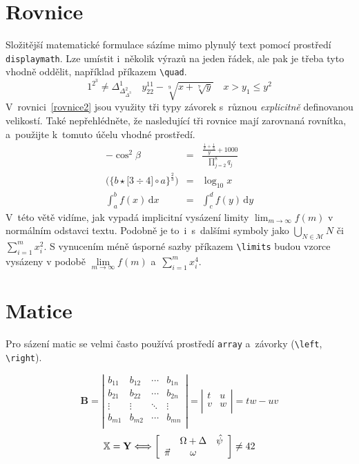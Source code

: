 \documentclass[hidelinks ,twoside, 11pt ,twocolumn, a4paper]{article}
\begin{document}
\section{Rovnice}
Složitější matematické formulace sázíme mimo plynulý text pomocí prostředí \verb|displaymath|. Lze umístit i~několik výrazů na jeden řádek, ale pak je třeba tyto vhodně oddělit, například příkazem \verb|\quad|. 
\begin{displaymath}
1^{2^3} \neq \Delta^1_{\Delta^2_{\Delta^3}}\quad
y^{11}_{22} - \sqrt[9]{x+\sqrt[7]{y}}\quad
 x > y_1 \le y^2
\end{displaymath}
V~rovnici~\eqref{rovnice2} jsou využity tři typy závorek s~různou \textit{explicitně} definovanou velikostí. Také nepřehlédněte, že nasledující tři rovnice mají zarovnaná rovnítka, a~použijte k~tomuto účelu vhodné prostředí.
\begin{eqnarray}
-\cos^2\beta & = & \frac{\frac{\frac{1}{x}+\frac{1}{3}}{y}+1000}{\prod\limits _{j=2}^8 q_j}\\
\label{rovnice2}
\bigg(\Big\{b\star\big[3\div4\big]\circ a\Big\}^{\frac{2}{3}}\bigg) & = & \log _{10} x\\
\label{rovnice3} 
\int_a^b f(x)\,\mathrm{d}x & = & \int_c^d f(y)\,\mathrm{d}y
\end{eqnarray}
V~této větě vidíme, jak vypadá implicitní vysázení limity $\lim_{m \to \infty} f(m)$ v normálním odstavci textu. Podobně je to~i~s~dalšími symboly jako $\bigcup_{N\in\mathcal{M}} N$ či $\sum_{i=1}^m x_i^2$. S vynucením méně úsporné sazby příkazem \verb|\limits| budou vzorce vysázeny v podobě $\lim\limits_{m \to \infty} f(m)$ a~$\sum\limits_{i=1}^m x_i^4$.

\section{Matice}
Pro sázení matic se velmi často používá prostředí \verb|array| a~závorky (\verb|\left|, \verb|\right|).

\[\mathbf{B} = \left| \begin{array}{cccc}
    b_{11} & b_{12} & \cdots & b_{1n}\\
    b_{21} & b_{22} & \cdots & b_{2n} \\
    \vdots & \vdots & \ddots & \vdots \\
    b_{m1} & b_{m2} & \cdots & b_{mn} \\
    \end{array} \right| = 
    \left| \begin{array}{cc}
    t & u \\
    v & w \\
    \end{array} \right| = 
    tw-uv\]
\[\mathbb{X} = \mathbf{Y} \Longleftrightarrow {\left[\begin{array}{ccc}
    \null & \Omega+\Delta & \hat{\psi}\\
    \vec{\pi} & \omega & \null
    \end{array} \right]} \ne 42\]
\end{document}
